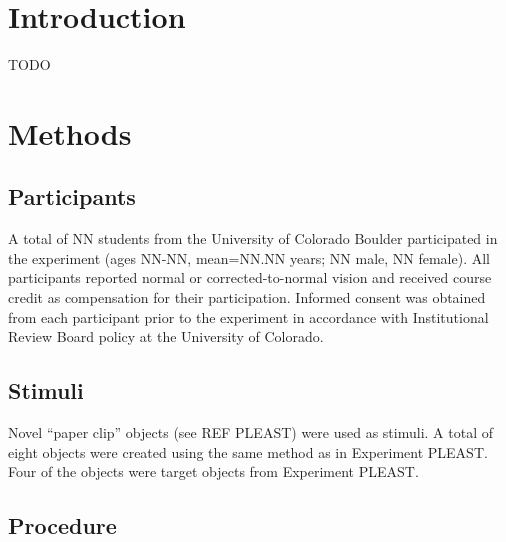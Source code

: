 \documentclass[defaultstyle,12pt]{article}
\begin{document}
\section{Introduction}
TODO

\section{Methods}

\subsection{Participants}
A total of NN students from the University of Colorado Boulder participated in the experiment (ages NN-NN, mean=NN.NN years; NN male, NN female). All participants reported normal or corrected-to-normal vision and received course credit as	compensation for their participation. Informed consent was obtained from each participant prior to the experiment in accordance with Institutional Review Board policy at the University of Colorado.

\subsection{Stimuli}
Novel ``paper clip'' objects (see REF PLEAST) were used as stimuli. A total of eight objects were created using the same method as in Experiment PLEAST. Four of the objects were target objects from Experiment PLEAST.

\subsection{Procedure}



\end{document}
